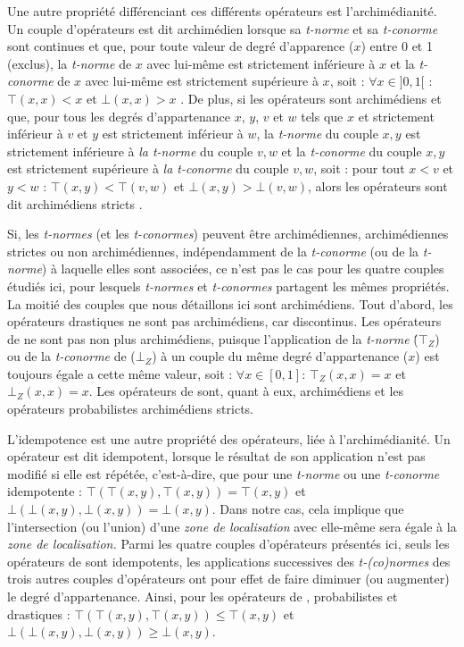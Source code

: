 Une autre propriété différenciant ces différents opérateurs est
l'archimédianité. Un couple d'opérateurs est dit archimédien lorsque
sa \emph{t-norme} et sa \emph{t-conorme} sont continues et que, pour
toute valeur de degré d’apparence (\(x\)) entre 0 et 1 (exclus), la
\emph{t-norme} de \(x\) avec lui-même est strictement inférieure à
\(x\) et la \emph{t-conorme} de \(x\) avec lui-même est strictement
supérieure à \(x\), soit : \(\forall x \in ]0,1[\) : \(⊤(x,x) < x\) et
\(⊥(x,x) > x\) \autocite{Bouchon-Meunier1995}. De plus, si les
opérateurs sont archimédiens et que, pour tous les degrés
d'appartenance \(x\), \(y\), \(v\) et \(w\) tels que \(x\) et
strictement inférieur à \(v\) et \(y\) est strictement inférieur à
\(w\), la \emph{t-norme} du couple \(x,y\) est strictement inférieure
à \emph{la t-norme} du couple \(v, w\) et la \emph{t-conorme} du
couple \(x,y\) est strictement supérieure à \emph{la t-conorme} du
couple \(v, w\), soit : pour tout \(x < v\) et \(y < w\) :
\(⊤(x,y) < ⊤(v,w)\) et \(⊥(x,y) > ⊥(v,w)\), alors les opérateurs sont
dit archimédiens stricts \autocite{Bouchon-Meunier1995}.

Si, les \emph{t-normes} (et les \emph{t-conormes}) peuvent être
archimédiennes, archimédiennes strictes ou non archimédiennes,
indépendamment de la \emph{t-conorme} (ou de la \emph{t-norme}) à
laquelle elles sont associées, ce n'est pas le cas pour les quatre
couples étudiés ici, pour lesquels \emph{t-normes} et
\emph{t-conormes} partagent les mêmes propriétés. La moitié des
couples que nous détaillons ici sont archimédiens. Tout d'abord, les
opérateurs drastiques ne sont pas archimédiens, car discontinus. Les
opérateurs de \textcite{Zadeh1965} ne sont pas non plus archimédiens,
puisque l’application de la \emph{t-norme} (́\(⊤_Z\)) ou de la
\emph{t-conorme} de  (\(⊥_Z\)) à un couple du même degré
d'appartenance (\(x\)) est toujours égale a cette même valeur, soit :
\(∀ x ∈ [0,1]\): \(⊤_Z(x,x) = x\) et \(⊥_Z(x,x) = x\).
%
Les opérateurs de  sont, quant à eux, archimédiens et
les opérateurs probabilistes archimédiens stricts.

L’idempotence est une autre propriété des opérateurs, liée à
l'archimédianité. Un opérateur est dit idempotent, lorsque le résultat
de son application n'est pas modifié si elle est répétée,
c'est-à-dire, que pour une \emph{t-norme} ou une \emph{t-conorme}
idempotente : \(⊤(⊤(x,y), ⊤(x,y)) = ⊤(x,y)\) et
\(⊥(⊥(x,y),⊥(x,y)) = ⊥(x,y)\).  Dans notre cas, cela implique que
l'intersection (ou l'union) d'une \emph{zone de localisation} avec
elle-même sera égale à la \emph{zone de localisation.}  Parmi les
quatre couples d'opérateurs présentés ici, seuls les opérateurs de
 sont idempotents, les applications successives des
\emph{t-(co)normes} des trois autres couples d'opérateurs ont pour
effet de faire diminuer (ou augmenter) le degré d'appartenance. Ainsi,
pour les opérateurs de , probabilistes et drastiques
: \(⊤(⊤(x,y), ⊤(x,y)) ≤ ⊤(x,y)\) et \(⊥(⊥(x,y),⊥(x,y)) ≥ ⊥(x,y)\).

